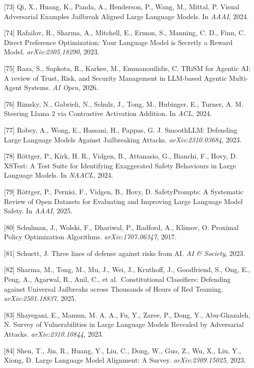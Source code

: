 {[}73{]} Qi, X., Huang, K., Panda, A., Henderson, P., Wang, M., Mittal, P. Visual Adversarial Examples Jailbreak Aligned Large Language Models. In \emph{AAAI}, 2024.

{[}74{]} Rafailov, R., Sharma, A., Mitchell, E., Ermon, S., Manning, C. D., Finn, C. Direct Preference Optimization: Your Language Model is Secretly a Reward Model. \emph{arXiv:2305.18290}, 2023.

{[}75{]} Raza, S., Sapkota, R., Karkee, M., Emmanouilidis, C. TRiSM for Agentic AI: A review of Trust, Risk, and Security Management in LLM-based Agentic Multi-Agent Systems. \emph{AI Open}, 2026.

{[}76{]} Rimsky, N., Gabrieli, N., Schulz, J., Tong, M., Hubinger, E., Turner, A. M. Steering Llama 2 via Contrastive Activation Addition. In \emph{ACL}, 2024.

{[}77{]} Robey, A., Wong, E., Hassani, H., Pappas, G. J. SmoothLLM: Defending Large Language Models Against Jailbreaking Attacks. \emph{arXiv:2310.03684}, 2023.

{[}78{]} Röttger, P., Kirk, H. R., Vidgen, B., Attanasio, G., Bianchi, F., Hovy, D. XSTest: A Test Suite for Identifying Exaggerated Safety Behaviours in Large Language Models. In \emph{NAACL}, 2024.

{[}79{]} Röttger, P., Pernisi, F., Vidgen, B., Hovy, D. SafetyPrompts: A Systematic Review of Open Datasets for Evaluating and Improving Large Language Model Safety. In \emph{AAAI}, 2025.

{[}80{]} Schulman, J., Wolski, F., Dhariwal, P., Radford, A., Klimov, O. Proximal Policy Optimization Algorithms. \emph{arXiv:1707.06347}, 2017.

{[}81{]} Schuett, J. Three lines of defense against risks from AI. \emph{AI \& Society}, 2023.

{[}82{]} Sharma, M., Tong, M., Mu, J., Wei, J., Kruthoff, J., Goodfriend, S., Ong, E., Peng, A., Agarwal, R., Anil, C., et al.~Constitutional Classifiers: Defending against Universal Jailbreaks across Thousands of Hours of Red Teaming. \emph{arXiv:2501.18837}, 2025.

{[}83{]} Shayegani, E., Mamun, M. A. A., Fu, Y., Zaree, P., Dong, Y., Abu-Ghazaleh, N. Survey of Vulnerabilities in Large Language Models Revealed by Adversarial Attacks. \emph{arXiv:2310.10844}, 2023.

{[}84{]} Shen, T., Jin, R., Huang, Y., Liu, C., Dong, W., Guo, Z., Wu, X., Liu, Y., Xiong, D. Large Language Model Alignment: A Survey. \emph{arXiv:2309.15025}, 2023.

